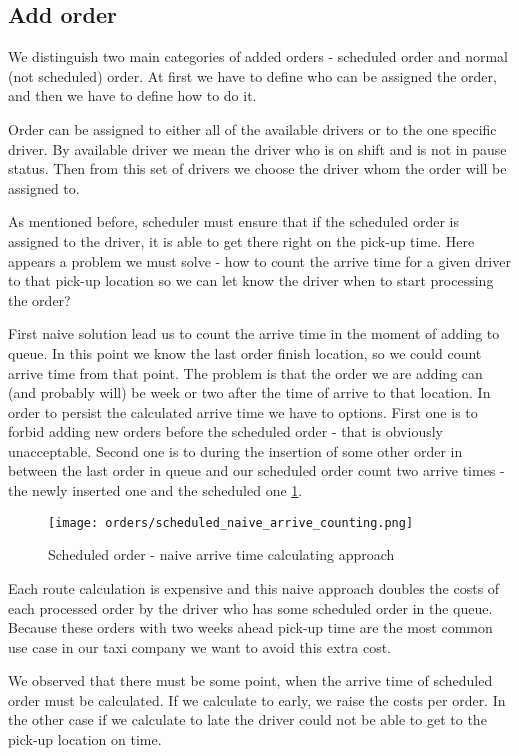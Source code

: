 \subsection{Add order}
We distinguish two main categories of added orders - scheduled order and normal (not scheduled) order. At first we have to define who can be assigned the order, and then we have to define how to do it.

Order can be assigned to either all of the available drivers or to the one specific driver. By available driver we mean the driver who is on shift and is not in pause status. Then from this set of drivers we choose the driver whom the order will be assigned to.

As mentioned before, scheduler must ensure that if the scheduled order is assigned to the driver, it is able to get there right on the pick-up time. Here appears a problem we must solve - how to count the arrive time for a given driver to that pick-up location so we can let know the driver when to start processing the order?

First naive solution lead us to count the arrive time in the moment of adding to queue. In this point we know the last order finish location, so we could count arrive time from that point. The problem is that the order we are adding can (and probably will) be week or two after the time of arrive to that location. In order to persist the calculated arrive time we have to options. First one is to forbid adding new orders before the scheduled order - that is obviously unacceptable. Second one is to during the insertion of some other order in between the last order in queue and our scheduled order count two arrive times - the newly inserted one and the scheduled one \ref{scheduled_naive_arrive_counting}. 

\begin{figure}[h]\centering
	\texttt{[image: orders/scheduled\_naive\_arrive\_counting.png]}
	\caption{Scheduled order - naive arrive time calculating approach} 
	\label{scheduled_naive_arrive_counting}
\end{figure} 

Each route calculation is expensive and this naive approach doubles the costs of each processed order by the driver who has some scheduled order in the queue. Because these orders with two weeks ahead pick-up time are the most common use case in our taxi company we want to avoid this extra cost. 

We observed that there must be some point, when the arrive time of scheduled order must be calculated. If we calculate to early, we raise the costs per order. In the other case if we calculate to late the driver could not be able to get to the pick-up location on time. 

